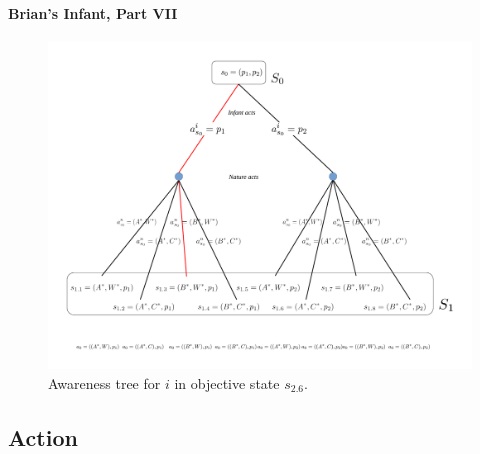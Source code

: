 \documentclass[
11pt,
titlepage,
reqno,
]{article}%
\theoremstyle{definition}
\begin{document}
\paragraph{Brian's Infant, Part VII}
\begin{figure}[h!]
	\centering
	\includegraphics*[page=8,trim = 0in 0in 1in 0in,scale=.7]{Awareness_Diagrams_All}
	\caption{Awareness tree for $i$ in objective state $s_{2.6}$.\label{Diag: p-08}}%
\end{figure}



\subsection{Action}
\end{document}

